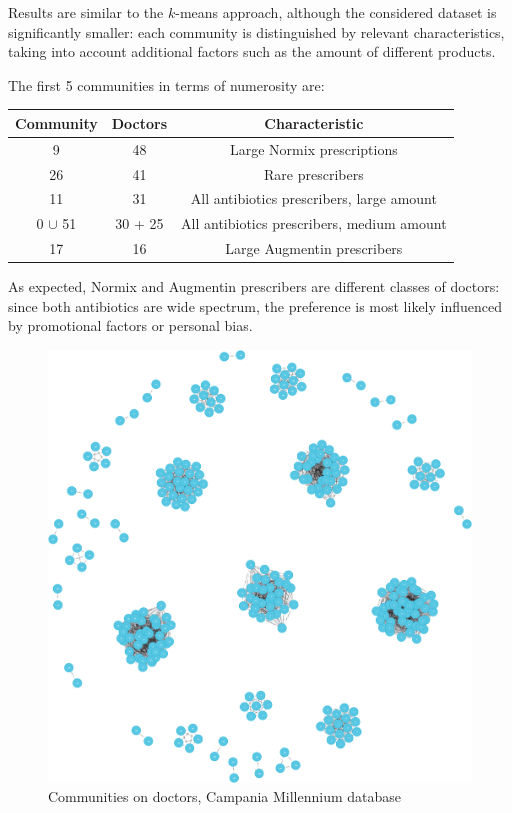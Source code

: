 Results are similar to the $k$-means approach, although the considered dataset is significantly smaller: each community is distinguished by relevant characteristics, taking into account additional factors such as the amount of different products.

The first 5 communities in terms of numerosity are:
\begin{center}
	\begin{tabular}{c|c|c}
		Community & Doctors  & Characteristic \\
		\hline
		9 & 48 & Large Normix prescriptions \\
		\hline
		26 & 41 & Rare prescribers \\
		\hline
		11 & 31 & All antibiotics prescribers, large amount \\
		\hline
		0 $\cup$ 51 & 30 + 25 & All antibiotics prescribers, medium amount \\
		\hline
		17 & 16 & Large Augmentin prescribers \\
		\hline
	\end{tabular}
\end{center}
\medskip
As expected, Normix and Augmentin prescribers are different classes of doctors: since both antibiotics are wide spectrum, the preference is most likely influenced by promotional factors or personal bias.
\medskip
\begin{figure}[h]
	\centering
	\includegraphics[scale=0.11]{./images/community-doctors.png}
	\caption{\small Communities on doctors, Campania Millennium database}
\end{figure}

